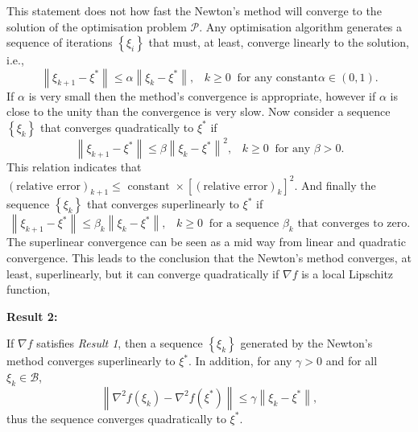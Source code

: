 This statement does not how fast the Newton's method will converge to the solution of the optimisation problem $\mathcal{P}$. Any optimisation algorithm generates a sequence of iterations $\left\{\xi_{i}\right\}$ that must, at least, converge linearly to the solution, i.e.,
\begin{equation}
   \left\|\xi_{k+1}-\xi^{\ast}\right\| \le \alpha \left\|\xi_{k}-\xi^{\ast}\right\|,\;\;\; k\ge 0\;\;\text{for any constant} \alpha\in\left(0,1\right). 
\end{equation}
If $\alpha$ is very small then the method's convergence is appropriate, however if $\alpha$ is close to the unity than the convergence is very slow. Now consider a sequence $\left\{\xi_{k}\right\}$ that converges quadratically to $\xi^{\ast}$ if 
\begin{equation}
   \left\|\xi_{k+1}-\xi^{\ast}\right\| \le \beta \left\|\xi_{k}-\xi^{\ast}\right\|^{2},\;\;\; k\ge 0\;\;\text{for any } \beta >0. 
\end{equation}
This relation indicates that $\left(\text{relative error}\right)_{k+1} \le \text{ constant }\times\left[\left(\text{relative error}\right)_{k}\right]^{2}$. %
And finally the sequence $\left\{\xi_{k}\right\}$ that converges superlinearly to $\xi^{\ast}$ if 
\begin{equation}
   \left\|\xi_{k+1}-\xi^{\ast}\right\| \le \beta_{k}
   \left\|\xi_{k}-\xi^{\ast}\right\|,\;\;\; k\ge 0\;\;\text{for a sequence } \beta_{k} \text{ that converges to zero}.
\end{equation}
The superlinear convergence can be seen as a mid way from linear and quadratic convergence. This leads to the conclusion that the Newton's method converges, at least, superlinearly, but it can converge quadratically if $\nabla f$ is a local Lipschitz function,
\begin{shaded}
\begin{center}
  {\bf Result 2:}
\end{center}
If $\nabla f$ satisfies {\it Result 1}, then a sequence $\left\{\xi_{k}\right\}$ generated by the Newton's method converges superlinearly to $\xi^{\ast}$. In addition, for any $\gamma > 0$ and for all $\xi_{k}\in\mathcal{B}$,
   \begin{displaymath}
       \left\|\nabla^{2}f\left(\xi_{k}\right) - \nabla^{2}f\left(\xi^{\ast}\right)\right\| \le \gamma \left\|\xi_{k}-\xi^{\ast}\right\|,
   \end{displaymath} 
   thus the sequence converges quadratically to $\xi^{\ast}$.
\end{shaded}


